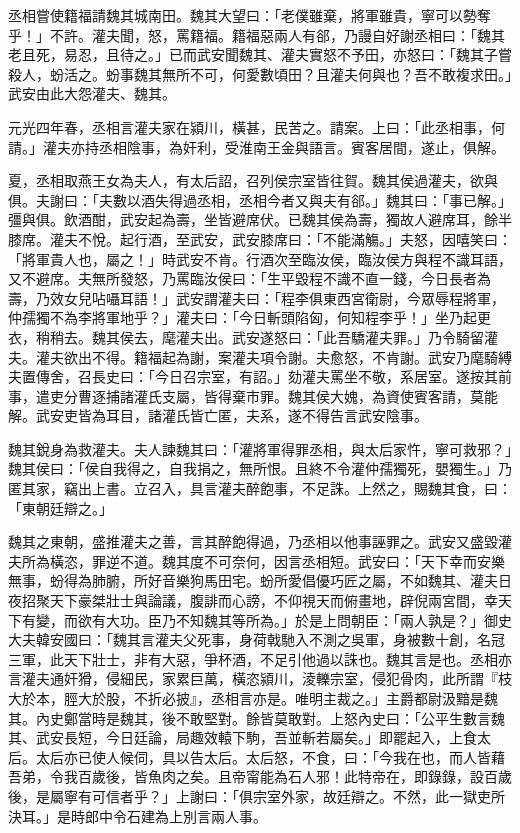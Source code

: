 \begin{pinyinscope}
丞相嘗使籍福請魏其城南田。魏其大望曰：「老僕雖棄，將軍雖貴，寧可以勢奪乎！」不許。灌夫聞，怒，罵籍福。籍福惡兩人有郤，乃謾自好謝丞相曰：「魏其老且死，易忍，且待之。」已而武安聞魏其、灌夫實怒不予田，亦怒曰：「魏其子嘗殺人，蚡活之。蚡事魏其無所不可，何愛數頃田？且灌夫何與也？吾不敢複求田。」武安由此大怨灌夫、魏其。

元光四年春，丞相言灌夫家在潁川，橫甚，民苦之。請案。上曰：「此丞相事，何請。」灌夫亦持丞相陰事，為奸利，受淮南王金與語言。賓客居間，遂止，俱解。

夏，丞相取燕王女為夫人，有太后詔，召列侯宗室皆往賀。魏其侯過灌夫，欲與俱。夫謝曰：「夫數以酒失得過丞相，丞相今者又與夫有郤。」魏其曰：「事已解。」彊與俱。飲酒酣，武安起為壽，坐皆避席伏。已魏其侯為壽，獨故人避席耳，餘半膝席。灌夫不悅。起行酒，至武安，武安膝席曰：「不能滿觴。」夫怒，因嘻笑曰：「將軍貴人也，屬之！」時武安不肯。行酒次至臨汝侯，臨汝侯方與程不識耳語，又不避席。夫無所發怒，乃罵臨汝侯曰：「生平毀程不識不直一錢，今日長者為壽，乃效女兒呫囁耳語！」武安謂灌夫曰：「程李俱東西宮衛尉，今眾辱程將軍，仲孺獨不為李將軍地乎？」灌夫曰：「今日斬頭陷匈，何知程李乎！」坐乃起更衣，稍稍去。魏其侯去，麾灌夫出。武安遂怒曰：「此吾驕灌夫罪。」乃令騎留灌夫。灌夫欲出不得。籍福起為謝，案灌夫項令謝。夫愈怒，不肯謝。武安乃麾騎縛夫置傳舍，召長史曰：「今日召宗室，有詔。」劾灌夫罵坐不敬，系居室。遂按其前事，遣吏分曹逐捕諸灌氏支屬，皆得棄市罪。魏其侯大媿，為資使賓客請，莫能解。武安吏皆為耳目，諸灌氏皆亡匿，夫系，遂不得告言武安陰事。

魏其銳身為救灌夫。夫人諫魏其曰：「灌將軍得罪丞相，與太后家忤，寧可救邪？」魏其侯曰：「侯自我得之，自我捐之，無所恨。且終不令灌仲孺獨死，嬰獨生。」乃匿其家，竊出上書。立召入，具言灌夫醉飽事，不足誅。上然之，賜魏其食，曰：「東朝廷辯之。」

魏其之東朝，盛推灌夫之善，言其醉飽得過，乃丞相以他事誣罪之。武安又盛毀灌夫所為橫恣，罪逆不道。魏其度不可奈何，因言丞相短。武安曰：「天下幸而安樂無事，蚡得為肺腑，所好音樂狗馬田宅。蚡所愛倡優巧匠之屬，不如魏其、灌夫日夜招聚天下豪桀壯士與論議，腹誹而心謗，不仰視天而俯畫地，辟倪兩宮間，幸天下有變，而欲有大功。臣乃不知魏其等所為。」於是上問朝臣：「兩人孰是？」御史大夫韓安國曰：「魏其言灌夫父死事，身荷戟馳入不測之吳軍，身被數十創，名冠三軍，此天下壯士，非有大惡，爭杯酒，不足引他過以誅也。魏其言是也。丞相亦言灌夫通奸猾，侵細民，家累巨萬，橫恣潁川，淩轢宗室，侵犯骨肉，此所謂『枝大於本，脛大於股，不折必披』，丞相言亦是。唯明主裁之。」主爵都尉汲黯是魏其。內史鄭當時是魏其，後不敢堅對。餘皆莫敢對。上怒內史曰：「公平生數言魏其、武安長短，今日廷論，局趣效轅下駒，吾並斬若屬矣。」即罷起入，上食太后。太后亦已使人候伺，具以告太后。太后怒，不食，曰：「今我在也，而人皆藉吾弟，令我百歲後，皆魚肉之矣。且帝甯能為石人邪！此特帝在，即錄錄，設百歲後，是屬寧有可信者乎？」上謝曰：「俱宗室外家，故廷辯之。不然，此一獄吏所決耳。」是時郎中令石建為上別言兩人事。


\end{pinyinscope}
